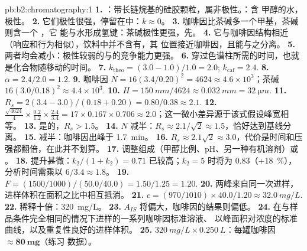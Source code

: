 \begin{solution}{pb:b2:chromatography:1}
\textbf{1.} ：带长链烷基的硅胶颗粒，属非极性。：含
甲醇的水，极性。
\textbf{2.} 它们极性很强，停留在中：$k \approx 0$。
\textbf{3.} 咖啡因比茶碱多一个甲基，茶碱则含一个 ，它
能与水形成氢键：茶碱极性更强，先。
\textbf{4.} 它与咖啡因结构相近（响应和行为相似），饮料中并不含有，其
位置接近咖啡因，且能与之分离。
\textbf{5.} 两者均会减小：极性较弱的与的竞争能力更强。
\textbf{6.} 穿过色谱柱所需的时间，也就是化合物随移动的时间。
\textbf{7.} $k_{\mathrm{theo}} = (3.0 - 1.0)/1.0 = 2.0$; $k_{\mathrm{caf}} = 2.4$.
\textbf{8.} $\alpha = 2.4/2.0 = 1.2$.
\textbf{9.} 咖啡因 $N = 16(3.4/0.20)^2 = 4624 \approx 4.6 \times 10^3$；茶碱 $16(3.0/0.18)^2
\approx 4.4 \times 10^3$.
\textbf{10.} $H = \qty{150}{mm}/4624 \approx \qty{0.032}{mm} = \qty{32}{\micro m}$.
\textbf{11.} $R_s = 2(3.4 - 3.0)/(0.18 + 0.20) = 0.80/0.38 \approx 2.1$.
\textbf{12.} $\frac{\sqrt{4624}}{4} \times \frac{0.2}{1.2} \times \frac{2.4}{3.4} = 17 \times 0.167 \times
0.706 \approx 2.0$；这一微小差异源于该式假设峰宽相等。
\textbf{13.} 是的，$R_s > 1.5$。
\textbf{14.} $N$ 减半：$R_s \approx 2.1/\sqrt2 \approx 1.5$，恰好达到基线分离。
\textbf{15.} 减半：咖啡因出峰于 \qty{1.7}{min}。
\textbf{16.} $R_s \approx 2.1\sqrt2 \approx 3.0$，代价是时间和压强都翻倍，在此并不划算。
\textbf{17.} 调整组成（甲醇比例、pH、另一种有机溶剂）或
。
\textbf{18.} 提升甚微：$k_2/(1 + k_2) = 0.71$ 已较高；$k_2 = 5$ 时将为 0.83（+18~\%），
分析时间需乘以 $6/3.4 \approx 1.8$。
\textbf{19.} $F = (1500/1000)/(50.0/40.0) = 1.50/1.25 = 1.20$.
\textbf{20.} 两峰来自同一次进样，进样体积在面积之比中相互抵消。
\textbf{21.} $c = (970/1010) \times 40.0/1.20 \approx \qty{32.0}{mg/L}$.
\textbf{22.} 稀释十倍：\qty{320}{mg/L}。
\textbf{23.} $A_{IS}$ 将偏大，咖啡因的结果则偏低。
\textbf{24.} 在与样品条件完全相同的情况下进样的一系列咖啡因标准溶液、
以峰面积对浓度的标准曲线，以及重复性良好的进样体积。
\textbf{25.} $\qty{320}{mg/L} \times \qty{0.250}{L}$：每罐咖啡因 $\boldsymbol{\approx \qty{80}{mg}}$（练习
数据）。
\end{solution}
